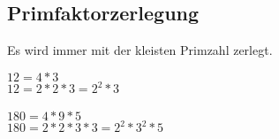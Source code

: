 \subsection{Primfaktorzerlegung}

\hfill \break
Es wird immer mit der kleisten Primzahl zerlegt.

\hfill \break
$12 = 4*3$\\
$12 = 2*2*3 = 2^2*3$\\

\hfill \break
\fboxrule=0.8pt \\

\hfill \break
$180 = 4*9*5$\\
$180 = 2*2*3*3 = 2^2*3^2*5$\\

\hfill \break
\fboxrule=0.8pt \\